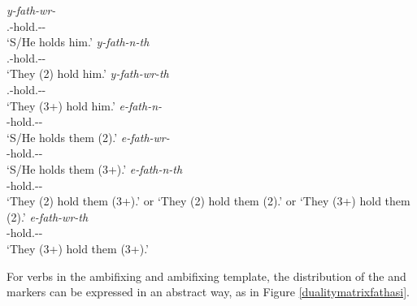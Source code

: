 \begin{exe}
\ex
\begin{xlist}
	\ex
	\gll \emph{y-fath-wr-\Zero}\\
	\Tsg.\Masc-hold.\Ext-\Ndu-\Stsg\\
	\trans `S/He holds him.'
	\label{ex215}
	\ex
	\gll \emph{y-fath-n-th}\\
	\Tsg.\Masc-hold.\Ext-\Du-\Stnsg\\
	\trans `They (2) hold him.'
	\label{ex216}
	\ex
	\gll \emph{y-fath-wr-th}\\
	\Tsg.\Masc-hold.\Ext-\Ndu-\Stnsg\\
	\trans `They (3+) hold him.'
	\label{ex217}
	\ex
	\gll \emph{e-fath-n-\Zero}\\
	\Stnsg-hold.\Ext-\Du-\Stsg\\
	\trans `S/He holds them (2).'
	\label{ex218}
	\ex
	\gll \emph{e-fath-wr-\Zero}\\
	\Stnsg-hold.\Ext-\Ndu-\Stsg\\
	\trans `S/He holds them (3+).'
	\label{ex221}
	\ex
	\gll \emph{e-fath-n-th}\\
	\Stnsg-hold.\Ext-\Du-\Stnsg\\
	\trans `They (2) hold them (3+).' or `They (2) hold them (2).' or `They (3+) hold them (2).'
	\label{ex219}
	\ex
	\gll \emph{e-fath-wr-th}\\
	\Stnsg-hold.\Ext-\Ndu-\Stnsg\\
	\trans `They (3+) hold them (3+).'
	\label{ex220}
\end{xlist}
\end{exe}

For verbs in the  ambifixing and  ambifixing template, the distribution of the  and  markers can be expressed in an abstract way, as in Figure \ref{dualitymatrixfathasi}.

